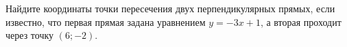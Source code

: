 \begin{ex}
	\begin{condition}
		Найдите координаты точки пересечения двух перпендикулярных прямых, если известно, что первая прямая задана уравнением \( y=-3x+1 \), а вторая проходит через точку \( (6;-2) \).
	\end{condition}
\end{ex}